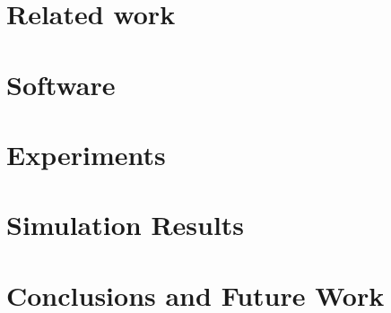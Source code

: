 \documentclass[runningheads]{llncs}
\begin{document}
\section{Related work}
\label{sec:related}


\section{Software}
\label{sec:software}


\section{Experiments}
\label{sec:expts}


\section{Simulation Results}
\label{sec:results}


\section{Conclusions and Future Work}
\label{sec:conc}



%
%
%


%
\end{document}
